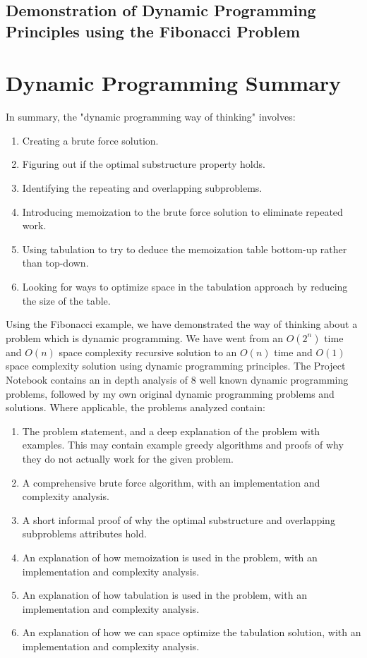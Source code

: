 \subsection{Demonstration of Dynamic Programming Principles using the Fibonacci Problem}


\section{Dynamic Programming Summary}

In summary, the "dynamic programming way of thinking" involves:
\begin{enumerate}
    \item Creating a brute force solution.
    \item Figuring out if the optimal substructure property holds.
    \item Identifying the repeating and overlapping subproblems.
    \item Introducing memoization to the brute force solution to eliminate repeated work.
    \item Using tabulation to try to deduce the memoization table bottom-up rather than top-down.
    \item Looking for ways to optimize space in the tabulation approach by reducing the size of the table.
\end{enumerate}

Using the Fibonacci example, we have demonstrated the way of thinking about a problem which is dynamic programming.
We have went from an $O(2^n)$ time and $O(n)$ space complexity recursive solution to an $O(n)$ time and $O(1)$ space complexity solution using dynamic programming principles.
The Project Notebook contains an in depth analysis of 8 well known dynamic programming problems, followed by my own original dynamic programming problems and solutions.
Where applicable, the problems analyzed contain:

\begin{enumerate}
    \item The problem statement, and a deep explanation of the problem with examples. This may contain example greedy algorithms and proofs of why they do not actually work for the given problem.
    \item A comprehensive brute force algorithm, with an implementation and complexity analysis.
    \item A short informal proof of why the optimal substructure and overlapping subproblems attributes hold.
    \item An explanation of how memoization is used in the problem, with an implementation and complexity analysis.
    \item An explanation of how tabulation is used in the problem, with an implementation and complexity analysis.
    \item An explanation of how we can space optimize the tabulation solution, with an implementation and complexity analysis.

\end{enumerate}

